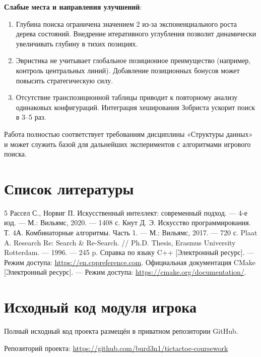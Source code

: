 \documentclass[12pt,a4paper]{article}
\begin{document}
\textbf{Слабые места и направления улучшений}:
\begin{enumerate}
    \item Глубина поиска ограничена значением 2 из-за экспоненциального роста дерева состояний. Внедрение итеративного углубления позволит динамически увеличивать глубину в тихих позициях.
    \item Эвристика не учитывает глобальное позиционное преимущество (например, контроль центральных линий). Добавление позиционных бонусов может повысить стратегическую силу.
    \item Отсутствие транспозиционной таблицы приводит к повторному анализу одинаковых конфигураций. Интеграция хеширования Зобриста ускорит поиск в 3--5 раз.
\end{enumerate}

Работа полностью соответствует требованиям дисциплины «Структуры данных» и может служить базой для дальнейших экспериментов с алгоритмами игрового поиска.


\section*{Список литературы}

\begin{thebibliography}{5}
 Рассел С., Норвиг П. Искусственный интеллект: современный подход. — 4-е изд. — М.: Вильямс, 2020. — 1408 с.
 Кнут Д. Э. Искусство программирования. Т. 4А. Комбинаторные алгоритмы. Часть 1. — М.: Вильямс, 2017. — 720 с.
 Plaat A. Research Re: Search \& Re-Search. // Ph.D. Thesis, Erasmus University Rotterdam. — 1996. — 245 p.
 Справка по языку C++ [Электронный ресурс]. — Режим доступа: \url{https://en.cppreference.com}.
 Официальная документация CMake [Электронный ресурс]. — Режим доступа: \url{https://cmake.org/documentation/}.
\end{thebibliography}

\section*{Исходный код модуля игрока}

Полный исходный код проекта размещён в приватном репозитории GitHub.


\noindent
Репозиторий проекта: \url{https://github.com/burd3n1/tictactoe-coursework}
\end{document}
